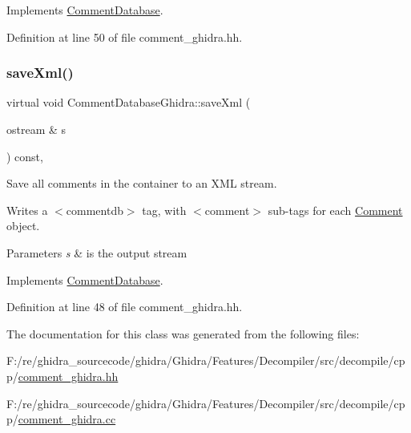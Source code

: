 Implements \mbox{\hyperlink{class_comment_database_a21e8b98e7f4276e239f6b2ea59191ded}{Comment\+Database}}.



Definition at line 50 of file comment\+\_\+ghidra.\+hh.

\mbox{\label{class_comment_database_ghidra_aed8e6973a2bfb1077970a2db93e4bde1}} 
\subsubsection{\texorpdfstring{saveXml()}{saveXml()}}
{\footnotesize\ttfamily virtual void Comment\+Database\+Ghidra\+::save\+Xml (\begin{DoxyParamCaption}\item[{ostream \&}]{s }\end{DoxyParamCaption}) const\hspace{0.3cm}{\ttfamily [inline]}, {\ttfamily [virtual]}}



Save all comments in the container to an X\+ML stream. 

Writes a $<$commentdb$>$ tag, with $<$comment$>$ sub-\/tags for each \mbox{\hyperlink{class_comment}{Comment}} object. 
\begin{DoxyParams}{Parameters}
{\em s} & is the output stream \\
\hline
\end{DoxyParams}


Implements \mbox{\hyperlink{class_comment_database_ab80e2cbdabe2e275695c5980b8f8eb9a}{Comment\+Database}}.



Definition at line 48 of file comment\+\_\+ghidra.\+hh.



The documentation for this class was generated from the following files\+:\begin{DoxyCompactItemize}
\item 
F\+:/re/ghidra\+\_\+sourcecode/ghidra/\+Ghidra/\+Features/\+Decompiler/src/decompile/cpp/\mbox{\hyperlink{comment__ghidra_8hh}{comment\+\_\+ghidra.\+hh}}\item 
F\+:/re/ghidra\+\_\+sourcecode/ghidra/\+Ghidra/\+Features/\+Decompiler/src/decompile/cpp/\mbox{\hyperlink{comment__ghidra_8cc}{comment\+\_\+ghidra.\+cc}}\end{DoxyCompactItemize}

